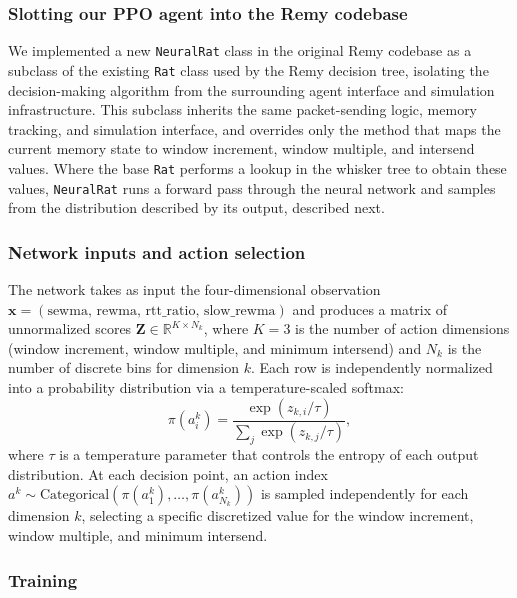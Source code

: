 \subsubsection{Slotting our PPO agent into the Remy codebase}

We implemented a new \texttt{NeuralRat} class in the original Remy codebase as a
subclass of the existing \texttt{Rat} class used by the Remy decision tree,
isolating the decision-making algorithm from the surrounding agent interface and
simulation infrastructure. This subclass inherits the same packet-sending logic,
memory tracking, and simulation interface, and overrides only the method that
maps the current memory state to window increment, window multiple, and
intersend values. Where the base \texttt{Rat} performs a lookup in the whisker
tree to obtain these values, \texttt{NeuralRat} runs a forward pass through the
neural network and samples from the distribution described by its output, described next.

\subsubsection{Network inputs and action selection}

The network takes as input the four-dimensional observation
$\mathbf{x} = (\text{sewma},\, \text{rewma},\, \text{rtt\_ratio},\, \text{slow\_rewma})$
and produces a matrix of unnormalized scores $\mathbf{Z} \in \mathbb{R}^{K
\times N_k}$, where $K = 3$ is the number of action dimensions (window
increment, window multiple, and minimum intersend) and $N_k$ is the number of
discrete bins for dimension $k$. Each row is independently normalized into a
probability distribution via a temperature-scaled softmax:
%
\begin{equation}
  \pi(a^k_i) = \frac{\exp(z_{k,i} / \tau)}{\sum_j \exp(z_{k,j} / \tau)},
\end{equation}
%
where $\tau$ is a temperature parameter that controls the entropy of each output
distribution. At each decision point, an action index
$a^k \sim \text{Categorical}(\pi(a^k_1), \ldots, \pi(a^k_{N_k}))$ is sampled
independently for each dimension $k$, selecting a specific discretized value for
the window increment, window multiple, and minimum intersend.

\subsubsection{Training}

